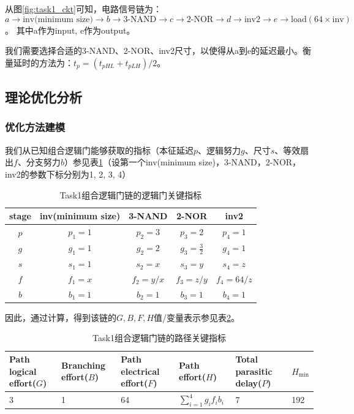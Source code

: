 \documentclass[UTF8,12pt,a4paper]{ctexart}
\begin{document}
从图\ref{fig:task1_ckt}可知，电路信号链为：
$$a \rightarrow \text{inv(minimum size)} \rightarrow b \rightarrow \text{3-NAND} \rightarrow c \rightarrow \text{2-NOR} \rightarrow d \rightarrow \text{inv2} \rightarrow e \rightarrow \text{load}(64 \times \text{inv})$$。
其中a作为input, e作为output。

我们需要选择合适的3-NAND、2-NOR、inv2尺寸，以使得从a到e的延迟最小。衡量延时的方法为：$t_p = (t_{pHL} + t_{pLH})/2$。

\subsection{理论优化分析}

\subsubsection{优化方法建模}

我们从已知组合逻辑门能够获取的指标（本征延迟$p$、逻辑努力$g$、尺寸$s$、等效扇出$f$、分支努力$b$）参见表\ref{tab:task1_metrics}（设第一个inv(minimum size)，3-NAND，2-NOR，inv2的参数下标分别为1, 2, 3, 4）

\begin{table}[htbp]
    \centering
    \caption{Task1组合逻辑门链的逻辑门关键指标}
    \label{tab:task1_metrics}
    \begin{tabular}{ccccc}
    \toprule
    stage & inv(minimum size) & 3-NAND & 2-NOR & inv2 \\
    \midrule
    $p$ & $p_1 = 1$ & $p_2 = 3$ & $p_3 = 2$ & $p_4 = 1$ \\
    $g$ & $g_1 = 1$ & $g_2 = 2$ & $g_3 = \frac{3}{2}$ & $g_4 = 1$ \\
    $s$ & $s_1 = 1$ & $s_2 = x$ & $s_3 = y$ & $s_4 = z$ \\
    $f$ & $f_1 = x$ & $f_2 = y/x$ & $f_3 = z/y$ & $f_4 = 64/z$ \\
    $b$ & $b_1 = 1$ & $b_2 = 1$ & $b_3 = 1$ & $b_4 = 1$ \\
    \bottomrule
    \end{tabular}
\end{table}

因此，通过计算，得到该链的$G,B,F,H$值/变量表示参见表\ref{tab:task1_path_metrics}。

\begin{table}[htbp]
    \centering
    \caption{Task1组合逻辑门链的路径关键指标}
    \label{tab:task1_path_metrics}
    \begin{tabularx}{\linewidth}{XXXXXX}
    \toprule
    Path logical effort($G$) & Branching effort($B$) &
    Path electrical effort($F$) & Path effort($H$) &
    Total parasitic delay($P$) & $H_{\text{min}}$ \\
    \midrule
    3 & 1 & 64 & $\sum_{i=1}^4{g_i f_i b_i}$ & 7 & 192  \\
    \bottomrule
    \end{tabularx}
\end{table}
\end{document}
